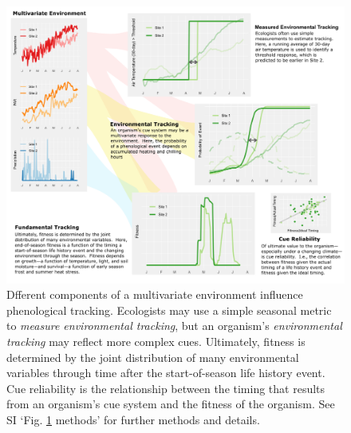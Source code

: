 \documentclass[11pt,letterpaper]{article}
\begin{document}
\begin{figure}[h!]
\centering
\includegraphics[width=1\textwidth]{..//..//..//R/graphs/conceptual/Fig3_pretty.png}
\caption{Dfferent components of a multivariate environment influence phenological tracking.  Ecologists may use a simple seasonal metric to \emph{measure environmental tracking}, but an organism's \emph{environmental tracking} may reflect more complex cues.  Ultimately, fitness is determined by the joint distribution of many environmental variables through time after the start-of-season life history event.  Cue reliability is the relationship between the timing that results from an organism's cue system and the fitness of the organism.  See SI `Fig. \ref{fig:defineET} methods' for further methods and details.} 
 \label{fig:defineET}
\end{figure}
\end{document}
